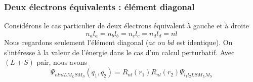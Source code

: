 \subsubsection{Deux électrons équivalents : élément diagonal}
Considérons le cas particulier de deux électrons équivalent à gauche et à droite
\begin{equation}
n_a l_a = n_b l_b = n_c l_c = n_d l_d = n l
\end{equation} 
Nous regardons seulement l'élément diagonal ($ac$ ou $bd$ est identique). On s'intéresse à la valeur
de l'énergie dans le cas d'un calcul perturbatif. Avec $(L+S)$ pair, nous avons
\begin{equation}
\Psi _{nl nl LM_LSM_S}(q_1,q_2)  
 = R_{nl}(r_1) R_{nl}(r_2) 
 \Psi_{l_1 l_2 LSM_LM_S}
\end{equation}

\ \\

